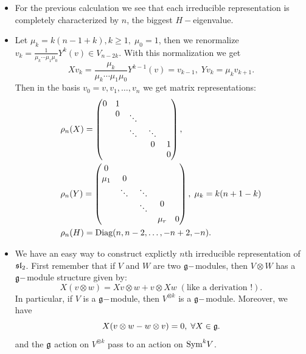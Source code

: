 \begin{itemize}
   \item For the previous calculation we see that each irreducible representation is completely characterized by $n$, 
   the biggest $H-$eigenvalue.

   \item Let $\mu_k=k(n-1+k),k\geq1,\; \mu_0=1$, then we renormalize 
   $v_k=\tfrac{1}{\mu_k\cdots\mu_1\mu_0}Y^k(v)\in V_{n-2k}$. With this 
   normalization we get 
   \begin{equation}
    Xv_k = \frac{\mu_k}{\mu_k\cdots\mu_1\mu_0}Y^{k-1}(v)=v_{k-1},\; Yv_k= \mu_kv_{k+1}.
   \end{equation}
   Then in the basis $v_0=v,v_1,\dots, v_n$ we get matrix representations:
   \begin{equation}
    \begin{split}
        &\rho_n(X)=\begin{pmatrix}
0&1&&&\\ &0&\rotatebox{-45}{$\cdots$}&&\\ &&\rotatebox{-45}{$\cdots$}&\rotatebox{-45}{$\cdots$}&\\&&&0&1\\&&&&0
\end{pmatrix},\\
        &\rho_n(Y)=\begin{pmatrix}
    0&&&&\\ \mu_1&0&&&\\ &\rotatebox{-45}{$\cdots$}&\rotatebox{-45}{$\cdots$}&&\\ &&\rotatebox{-45}{$\cdots$}&0&\\ &&&\mu_r&0
\end{pmatrix},\;\mu_k=k(n+1-k)\\
        &\rho_n(H)=\text{Diag}(n,n-2,\dots,-n+2,-n).
    \end{split}
  \end{equation}

  \item We have an easy way to construct explictly $n$th irreducible representation of $\mathfrak{sl}_2$. 
  First remember that if $V$ and $W$ are two $\mathfrak{g}-$modules, then $V\otimes W$ has a $\mathfrak{g}-$module structure
  given by: 
  \begin{equation}
    X(v\otimes w)=Xv\otimes w + v\otimes Xw\; (\text{like a derivation !}).
  \end{equation}
  In particular, if $V$ is a $\mathfrak{g}-$module, then $V^{\otimes k}$ is a $\mathfrak{g}-$module. Moreover, we have 
  \begin{equation}
    X(v\otimes w - w\otimes v)=0,\;\forall X\in \mathfrak{g}.
  \end{equation}  
  and the $\mathfrak{g}$ action on $V^{\otimes k}$ pass to an action on $\text{Sym}^k V$.\par 


\end{itemize}
